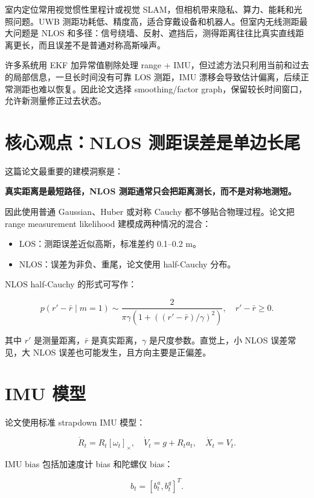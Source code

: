 \documentclass[UTF8,a4paper,12pt]{ctexrep}
\begin{document}
室内定位常用视觉惯性里程计或视觉 SLAM，但相机带来隐私、算力、能耗和光照问题。UWB 测距功耗低、精度高，适合穿戴设备和机器人。但室内无线测距最大问题是 NLOS 和多径：信号绕墙、反射、遮挡后，测得距离往往比真实直线距离更长，而且误差不是普通对称高斯噪声。

许多系统用 EKF 加异常值剔除处理 range + IMU，但过滤方法只利用当前和过去的局部信息，一旦长时间没有可靠 LOS 测距，IMU 漂移会导致估计偏离，后续正常测距也难以恢复。因此论文选择 smoothing/factor graph，保留较长时间窗口，允许新测量修正过去状态。

\section{核心观点：NLOS 测距误差是单边长尾}

这篇论文最重要的建模洞察是：

\begin{center}
\textbf{真实距离是最短路径，NLOS 测距通常只会把距离测长，而不是对称地测短。}
\end{center}

因此使用普通 Gaussian、Huber 或对称 Cauchy 都不够贴合物理过程。论文把 range measurement likelihood 建模成两种情况的混合：

\begin{itemize}
  \item LOS：测距误差近似高斯，标准差约 0.1--0.2 m。
  \item NLOS：误差为非负、重尾，论文使用 half-Cauchy 分布。
\end{itemize}

NLOS half-Cauchy 的形式可写作：

\[
p(r'-\bar r\mid m=1)\sim
\frac{2}{\pi\gamma\left(1+\left((r'-\bar r)/\gamma\right)^2\right)},
\quad r'-\bar r\ge 0.
\]

其中 \(r'\) 是测量距离，\(\bar r\) 是真实距离，\(\gamma\) 是尺度参数。直觉上，小 NLOS 误差常见，大 NLOS 误差也可能发生，且方向主要是正偏差。

\section{IMU 模型}

论文使用标准 strapdown IMU 模型：

\[
\dot R_t=R_t[\omega_t]_\times,\quad
\dot V_t=g+R_t a_t,\quad
\dot X_t=V_t.
\]

IMU bias 包括加速度计 bias 和陀螺仪 bias：

\[
b_t=[b_t^a,b_t^g]^T.
\]
\end{document}
